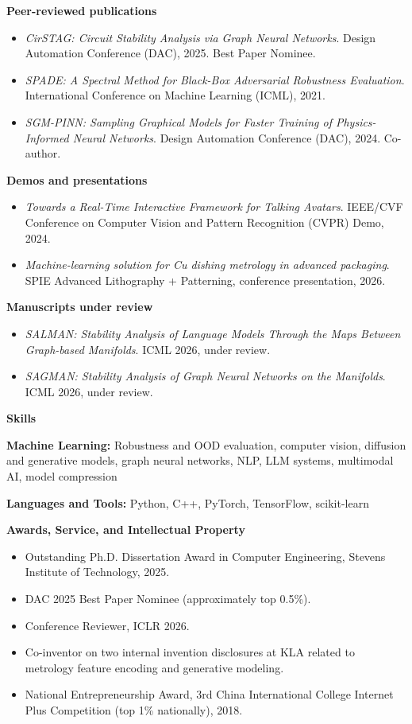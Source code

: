 \documentclass[11pt]{article}
\newcommand{\sectiontitle}[1]{%
  \vspace{10pt}%
  {\large\sffamily\bfseries\color{heading} #1}\par
  \vspace{3pt}{\color{heading!55}\hrule}\vspace{6pt}
}
\newcommand{\pubsubhead}[1]{{\sffamily\bfseries #1}\par\vspace{2pt}}
\begin{document}
\pubsubhead{Peer-reviewed publications}
\begin{itemize}
    \item \textit{CirSTAG: Circuit Stability Analysis via Graph Neural Networks}. Design Automation Conference (DAC), 2025. Best Paper Nominee.
    \item \textit{SPADE: A Spectral Method for Black-Box Adversarial Robustness Evaluation}. International Conference on Machine Learning (ICML), 2021.
    \item \textit{SGM-PINN: Sampling Graphical Models for Faster Training of Physics-Informed Neural Networks}. Design Automation Conference (DAC), 2024. Co-author.
\end{itemize}

\pubsubhead{Demos and presentations}
\begin{itemize}
    \item \textit{Towards a Real-Time Interactive Framework for Talking Avatars}. IEEE/CVF Conference on Computer Vision and Pattern Recognition (CVPR) Demo, 2024.
    \item \textit{Machine-learning solution for Cu dishing metrology in advanced packaging}. SPIE Advanced Lithography + Patterning, conference presentation, 2026.
\end{itemize}

\pubsubhead{Manuscripts under review}
\begin{itemize}
    \item \textit{SALMAN: Stability Analysis of Language Models Through the Maps Between Graph-based Manifolds}. ICML 2026, under review.
    \item \textit{SAGMAN: Stability Analysis of Graph Neural Networks on the Manifolds}. ICML 2026, under review.
\end{itemize}

\sectiontitle{Skills}
\textbf{Machine Learning:} Robustness and OOD evaluation, computer vision, diffusion and generative models, graph neural networks, NLP, LLM systems, multimodal AI, model compression\par
\textbf{Languages and Tools:} Python, C++, PyTorch, TensorFlow, scikit-learn

\sectiontitle{Awards, Service, and Intellectual Property}
\begin{itemize}
    \item Outstanding Ph.D. Dissertation Award in Computer Engineering, Stevens Institute of Technology, 2025.
    \item DAC 2025 Best Paper Nominee (approximately top 0.5\%).
    \item Conference Reviewer, ICLR 2026.
    \item Co-inventor on two internal invention disclosures at KLA related to metrology feature encoding and generative modeling.
    \item National Entrepreneurship Award, 3rd China International College Internet Plus Competition (top 1\% nationally), 2018.
\end{itemize}
\end{document}
